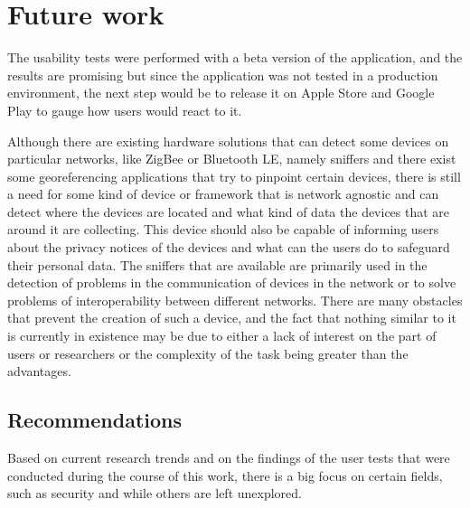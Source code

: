 %
%
\section{Future work}\label{section:future_work}

The usability tests were performed with a beta version of the application,
and the results are promising but since the application was not tested in a production environment,
the next step would be to release it on Apple Store and Google Play to
gauge how users would react to it.

Although there are existing hardware solutions that can detect some devices
on particular networks, like ZigBee or Bluetooth LE, namely \hyperlink{\acronym}{\acronym} sniffers
and there exist some georeferencing applications that try to pinpoint certain
\hyperlink{\acronym}{\acronym} devices, there is still a need for some kind of device or framework
that is network agnostic and can detect where the devices are located and
what kind of data the \hyperlink{\acronym}{\acronym} devices that are around it are collecting. This
device should also be capable of informing users about the privacy notices
of the devices and what can the users do to safeguard their personal data.
The \hyperlink{\acronym}{\acronym} sniffers that are available are primarily used in the detection
of problems in the communication of devices in the network or to solve problems
of interoperability between different \hyperlink{\acronym}{\acronym} networks. There are many obstacles
that prevent the creation of such a device, and the fact that nothing similar
to it is currently in existence may be due to either a lack of interest on the
part of users or researchers or the complexity of the task being greater than
the advantages.

\subsection{Recommendations}

Based on current research trends and on the findings of the user tests that were
conducted during the course of this work, there is a big focus on certain
fields, such as security and \hyperlink{\acronym}{\acronym} while others are left unexplored.


